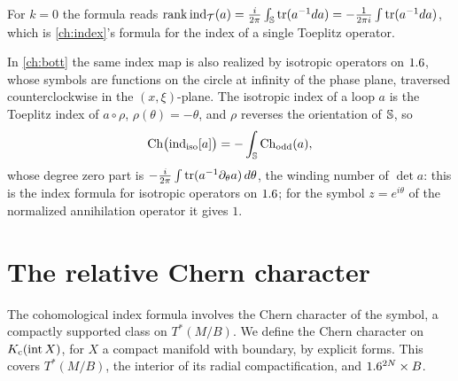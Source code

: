 \begin{remark}\label{families:rem:toeplitz-check}
  For $k=0$ the formula reads $\operatorname{rank}\operatorname{ind}_{\mathcal T}(a)=
  \frac{i}{2\pi}\int_{\mathbb{S}}\operatorname{tr}(a^{-1}da)=-\frac{1}{2\pi i}\int\operatorname{tr}(a^{-1}da)$,
  which is \cref{ch:index}'s formula for the index of a single Toeplitz
  operator.
\end{remark}

\begin{remark}\label{families:rem:iso-chern}
  In \cref{ch:bott} the same index map is also realized by isotropic operators on
  $1.6$, whose symbols are functions on the circle at infinity of the phase plane,
  traversed counterclockwise in the $(x,\xi)$-plane. The isotropic index of a loop
  $a$ is the Toeplitz index of $a\circ\rho$, $\rho(\theta)=-\theta$, and $\rho$ reverses the
  orientation of $\mathbb{S}$, so
  \begin{equation*}
    \operatorname{Ch}\bigl(\operatorname{ind}_{\mathrm{iso}}[a]\bigr)=-\int_{\mathbb{S}}\operatorname{Ch}_{\mathrm{odd}}(a),
  \end{equation*}
  whose degree zero part is $-\frac{i}{2\pi}\int\operatorname{tr}(a^{-1}\partial_\theta a)\,d\theta$, the winding number of $\det a$: this is the
  index formula for isotropic operators on $1.6$; for the symbol $z=e^{i\theta}$ of the
  normalized annihilation operator it gives $1$.
\end{remark}

\section{The relative Chern character}\label{families:sec:relative}

The cohomological index formula involves the Chern character of the symbol,
a compactly supported class on $T^*(M/B)$. We define the Chern character on
$K_{\mathrm{c}}(\operatorname{int}X)$, for $X$ a compact manifold with boundary, by
explicit forms. This covers $T^*(M/B)$, the interior of its radial
compactification, and $1.6^{2N}\times B$.

